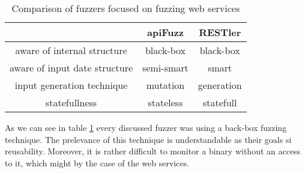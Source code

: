 \begin{table}
\begin{center}
\begin{tabular}{|c|c c|}
\hline
& apiFuzz  &  RESTler  \\
\hline
aware of internal structure & black-box & black-box \\
aware of input date structure & semi-smart & smart \\
input generation technique & mutation & generation \\
statefullness & stateless & statefull \\
\hline
\end{tabular}
\caption{Comparison of fuzzers focused on fuzzing web services}
\label{table:fuzzers-comparison}
\end{center}
\end{table}

As we can see in table \ref{table:fuzzers-comparison} every discussed fuzzer was using a back-box fuzzing technique. The prelevance of this technique is understandable as their goals si reusability. Moreover, it is rather difficult to monitor a binary without an access to it, which might by the case of the web services.

